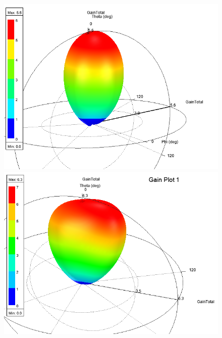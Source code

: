 \documentclass[10pt, a4paper]{article}%
\begin{document}
\begin{figure}[ht!]
	\centering
	\begin{minipage}{0.32\textwidth}
		\centering
		\includegraphics[width= 1\textwidth]{RAD_LIN_free_space.png}
	\end{minipage}%
	\hfill
	\begin{minipage}{0.32\textwidth}
		\centering
		\includegraphics[width= 1\textwidth]{RAD_lin_phantom.png}
	\end{minipage}
	\hfill
	\begin{minipage}{0.32\textwidth}
		\centering

\end{minipage}
\end{figure}
\end{document}
